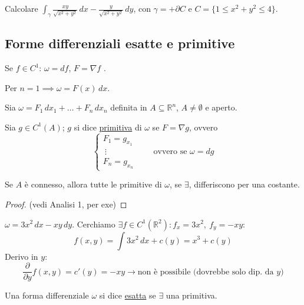 \begin{esercizio}[EXE 2]
Calcolare $\displaystyle\int_\gamma \frac{xy}{\sqrt{x^2 + y^2}}\, dx - \frac{y}{\sqrt{x^2 + y^2}}\, dy$, con $\gamma = +\partial C$ e $C = \{ 1 \le x^2 + y^2 \le 4 \}$.
\end{esercizio}

\subsection{Forme differenziali esatte e primitive}

\begin{oss}
Se $f \in C^1$: $\omega = df$, $F = \nabla f$ .

Per $n = 1 \implies \omega = F(x)\, dx$.
\end{oss}

\begin{definition}[Primitiva]
Sia $\omega = F_1\, dx_1 + \dots + F_n\, dx_n$ definita in $A \subseteq \mathbb{R}^n$, $A \neq \emptyset$ e aperto.

Sia $g \in C^1(A)$; $g$ si dice \underline{primitiva} di $\omega$ se $F = \nabla g$, ovvero
\[
\begin{cases}
F_1 = g_{x_1} \\
\ \vdots \\
F_n = g_{x_n}
\end{cases}
\qquad \text{ovvero se } \omega = dg
\]
\end{definition}

\begin{prop}
Se $A$ è connesso, allora tutte le primitive di $\omega$, se $\exists$, differiscono per una costante.
\end{prop}

\begin{proof}
(vedi Analisi 1, per exe)
\end{proof}

\begin{esercizio}[EXE]
$\omega = 3x^2\, dx - xy\, dy$. Cerchiamo $\exists f \in C^1(\mathbb{R}^2) : f_x = 3x^2, \ f_y = -xy$:
\[
f(x, y) = \int 3x^2\, dx + c(y) = x^3 + c(y)
\]
Derivo in $y$:
\[
\frac{\partial}{\partial y} f(x, y) = c'(y) = -xy \to \text{non è possibile (dovrebbe solo dip. da $y$)}
\]
\end{esercizio}

\begin{definition}
Una forma differenziale $\omega$ si dice \underline{esatta} se $\exists$ una primitiva.
\end{definition}

